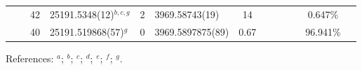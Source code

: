 \begin{table*}
\begin{center}
{\begin{tabular}{:l;l;c;l;c;l;c;l;l;c;c;c;c}
\rowstyle{\itshape}               &        & 42        & 25191.5348(12)$^{b,c,g}$         & 2 &    3969.58743(19)  &   14 & $                                        $ & $                                        $ & $      $ &              & 0.647\%   & $     ^{}     $\\
\rowstyle{\itshape}               &        & 40        & 25191.519868(57)$^{g}$           & 0 &  3969.5897875(89)  & 0.67 & $                                        $ & $                                        $ & $      $ &              & 96.941\%  & $     ^{}     $\\
\hline
\end{tabular}
}
{\footnotesize References:
$^{a}$\citet{Dzuba:2007:062510};
$^{b}$\citet{Maleki:1992:524};
$^{c}$\citet{Martensson-Pendrill:1992:4675};
$^{d}$\citet{Wolf:2009:223901};
$^{e}$\citet{Arbes:1994:27};
$^{f}$\citet{Nortershauser:1998:33};
$^{g}$\citet{Wolf:2008:032511}.}
\end{center}
\end{table*}
